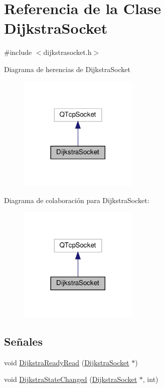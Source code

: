 \hypertarget{class_dijkstra_socket}{}\section{Referencia de la Clase Dijkstra\+Socket}
\label{class_dijkstra_socket}


{\ttfamily \#include $<$dijkstrasocket.\+h$>$}



Diagrama de herencias de Dijkstra\+Socket
\nopagebreak
\begin{figure}[H]
\begin{center}
\leavevmode
\includegraphics[width=161pt]{class_dijkstra_socket__inherit__graph}
\end{center}
\end{figure}


Diagrama de colaboración para Dijkstra\+Socket\+:
\nopagebreak
\begin{figure}[H]
\begin{center}
\leavevmode
\includegraphics[width=161pt]{class_dijkstra_socket__coll__graph}
\end{center}
\end{figure}
\subsection*{Señales}
\begin{DoxyCompactItemize}
\item 
void \hyperlink{class_dijkstra_socket_ad942276d377f42992ac9dfd5fe32219c}{Dijkstra\+Ready\+Read} (\hyperlink{class_dijkstra_socket}{Dijkstra\+Socket} $\ast$)
\item 
void \hyperlink{class_dijkstra_socket_a4527ae22be46f923b0c13eabf170e96f}{Dijkstra\+State\+Changed} (\hyperlink{class_dijkstra_socket}{Dijkstra\+Socket} $\ast$, int)
\end{DoxyCompactItemize}
